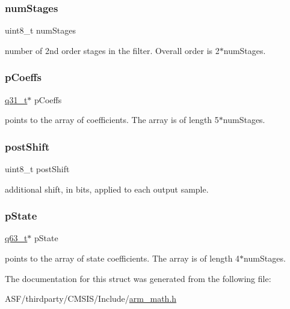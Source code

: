 \subsubsection{\texorpdfstring{numStages}{numStages}}
{\footnotesize\ttfamily uint8\+\_\+t num\+Stages}

number of 2nd order stages in the filter. Overall order is 2$\ast$num\+Stages. \mbox{\label{structarm__biquad__cas__df1__32x64__ins__q31_a68888e36167d81cb7836db10367a1682}} 
\subsubsection{\texorpdfstring{pCoeffs}{pCoeffs}}
{\footnotesize\ttfamily \mbox{\hyperlink{arm__math_8h_adc89a3547f5324b7b3b95adec3806bc0}{q31\+\_\+t}}$\ast$ p\+Coeffs}

points to the array of coefficients. The array is of length 5$\ast$num\+Stages. \mbox{\label{structarm__biquad__cas__df1__32x64__ins__q31_a74050e9f36542bd56f4052381a82ae8f}} 
\subsubsection{\texorpdfstring{postShift}{postShift}}
{\footnotesize\ttfamily uint8\+\_\+t post\+Shift}

additional shift, in bits, applied to each output sample. \mbox{\label{structarm__biquad__cas__df1__32x64__ins__q31_adefeb77301cc04e4d7d22f323029d588}} 
\subsubsection{\texorpdfstring{pState}{pState}}
{\footnotesize\ttfamily \mbox{\hyperlink{arm__math_8h_a5aea1cb12fc02d9d44c8abf217eaa5c6}{q63\+\_\+t}}$\ast$ p\+State}

points to the array of state coefficients. The array is of length 4$\ast$num\+Stages. 

The documentation for this struct was generated from the following file\+:\begin{DoxyCompactItemize}
\item 
A\+S\+F/thirdparty/\+C\+M\+S\+I\+S/\+Include/\mbox{\hyperlink{arm__math_8h}{arm\+\_\+math.\+h}}\end{DoxyCompactItemize}
